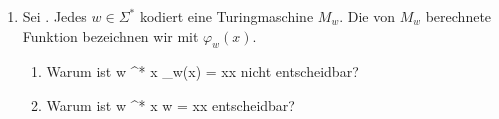 \documentclass{lehramt-informatik-aufgabe}
\begin{document}
\begin{enumerate}

\item Sei . Jedes $w \in \Sigma^*$ kodiert eine
Turingmaschine $M_w$. Die von  $M_w$ berechnete Funktion bezeichnen wir
mit $\varphi_w(x)$.

\begin{enumerate}


\item Warum ist
\liAusdruck
{w \in \Sigma^*}
{\exists x \colon \varphi_w(x) = xx} nicht entscheidbar?


\item Warum ist \liAusdruck
{w \in \Sigma^*}
{\exists x \colon w = xx} entscheidbar?

\end{enumerate}
\end{enumerate}
\end{document}

